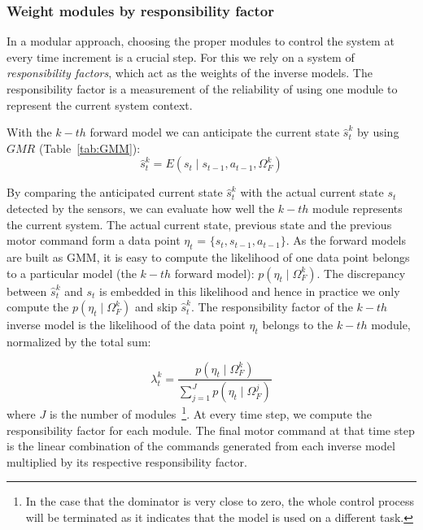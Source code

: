 \subsubsection{Weight modules by responsibility factor}
\label{cha4:sec2:control:rf}

In a modular approach, choosing the proper modules to control the
system at every time increment is a crucial step. For this we rely on
a system of {\em responsibility factors}, which act as the weights of
the inverse models. The responsibility factor is a measurement of the
reliability of using one module to represent the current system
context.

With the $k-{th}$ forward model we can anticipate the current state ${\hat{s}} ^k_t$ by using $GMR$ (Table~\ref{tab:GMM}):
\begin{equation}
\label{e3}
{\hat{s}} ^k_{t} = E\left({s_t {\mid} s_{t-1}, a_{t-1}, \Omega^k_F}\right)
\end{equation}

By comparing the anticipated current state ${\hat{s}} ^k_t$ with the
actual current state $s_t$ detected by the sensors, we can evaluate
how well the $k-{th}$ module represents the current system. The actual
current state, previous state and the previous motor command form a
data point $\eta_t$ = $\{s_t,s_{t-1},a_{t-1}\}$. As the forward models
are built as GMM, it is easy to compute the likelihood of one data
point belongs to a particular model (the $k-th$ forward model): $p(\eta_t {\mid}
\Omega_F^k)$. The discrepancy between $\hat{s}^k_t$ and $s_t$ is
embedded in this likelihood and hence in practice we only compute the
$p(\eta_t {\mid} \Omega_F^k)$ and skip ${\hat{s}} ^k_t$.  The
responsibility factor of the $k-{th}$ inverse model is the likelihood of
the data point $\eta_t$ belongs to the $k-{th}$ module, normalized by
the total sum:

\begin{equation}
\lambda^k_t = \frac{p(\eta_t {\mid} \Omega_F^k)}{\sum_{j=1}^{J}{p(\eta_t {\mid} \Omega_F^j)}}
\end{equation}
where $J$ is the number of modules~\footnote{In the case that the
  dominator is very close to zero, the whole control process will be
  terminated as it indicates that the model is used on a different
  task.}.  At every time step, we compute the responsibility factor
for each module. The final motor command at that time step is the
linear combination of the commands generated from each inverse model
multiplied by its respective responsibility factor.


